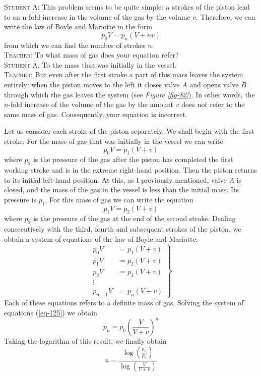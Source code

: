 \documentclass[a4paper,sfsidenotes]{tufte-book}
\begin{document}
\textsc{Student A:} This problem seems to be quite simple: $n$ strokes of the piston lead to an n-fold increase in the volume of the gas by the volume $v$. Therefore, we can write the law of Boyle and Mariotte in the form
\begin{equation*}%
p_{0}V = p_{n} (V + nv)
\end{equation*}
from which we can find the number of strokes $n$.
\\
\textsc{Teacher:} To what mass of gas does your equation refer?
\\
\textsc{Student A:} To the mass that was initially in the vessel.
\\
\textsc{Teacher:} But even after the first stroke a part of this mass leaves the system entirely: when the piston moves to the left it closes valve $A$ and opens valve $B$ through which the gas leaves the system (see \emph{Figure \ref{fig-82}}). In other words, the $n$-fold increase of the volume of the gas by the amount $v$ does not refer to the same mass of gas. Consequently, your equation is incorrect.

Let us consider each stroke of the piston separately. We shall begin with the first stroke. For the mass of gas that was initially in the vessel we can write
\begin{equation*}%
p_{0}V = p_{1} (V + v)
\end{equation*}
where $p_{2}$ is the pressure of the gas after the piston has completed the first working stroke and is in the extreme right-hand position. Then the piston returns to its initial left-hand position. At this, as I previously mentioned, valve $A$ is closed, and the mass of the gas in the vessel is less than the initial mass. Its pressure is $p_{1}$. For this mass of gas we can write the equation
\begin{equation*}%
p_{1}V = p_{2} (V + v)
\end{equation*}
where $p_{2}$ is the pressure of the gas at the end of the second stroke. Dealing consecutively with the third, fourth and subsequent strokes of the piston, we obtain a system of equations of the law of Boyle and Mariotte:
\begin{equation}%
\left.
\begin{split}
p_{0}V & = p_{1} (V + v)\\
p_{1}V &= p_{2} (V + v)\\
p_{2}V & = p_{3} (V + v)\\
\vdots \\
p_{n-1}V & =p_{n} (V+v)
\label{eq-125}
\end{split}
\right\}
\end{equation}
Each of these equations refers to a definite mass of gas. Solving the system of equations (\ref{eq-125}) we obtain
\begin{equation*}%
p_{n}= p_{0} \left( \dfrac{V}{V+v} \right)^{n}
\end{equation*}
Taking the logarithm of this result, we finally obtain
\begin{equation}%
n = \frac{\log \left(\frac{p_{n}}{p_{0}}\right)}{\log \left( \frac{V}{V+v} \right)}
\label{eq-126}
\end{equation}
\end{document}
